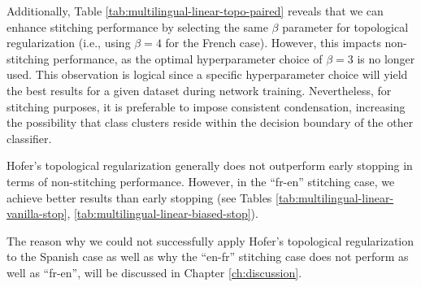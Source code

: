 \documentclass[../main.tex]{subfiles}
\begin{document}
\begin{table}[ht!]
\centering
{}
\caption{Topological reg. w/ matched params (over two random seeds)}
\label{tab:multilingual-linear-topo-paired}
\end{table}

Additionally, Table \ref{tab:multilingual-linear-topo-paired} reveals that we can enhance stitching performance by selecting the same $\beta$ parameter for topological regularization (i.e., using $\beta=4$ for the French case). However, this impacts non-stitching performance, as the optimal hyperparameter choice of $\beta=3$ is no longer used. This observation is logical since a specific hyperparameter choice will yield the best results for a given dataset during network training. Nevertheless, for stitching purposes, it is preferable to impose consistent condensation, increasing the possibility that class clusters reside within the decision boundary of the other classifier.

\begin{mathNote}
Hofer's topological regularization generally does not outperform early stopping in terms of non-stitching performance. However, in the ``fr-en'' stitching case, we achieve better results than early stopping (see Tables \ref{tab:multilingual-linear-vanilla-stop}, \ref{tab:multilingual-linear-biased-stop}).
\end{mathNote}

The reason why we could not successfully apply Hofer's topological regularization to the Spanish case as well as why the ``en-fr'' stitching case does not perform as well as ``fr-en'', will be discussed in Chapter \ref{ch:discussion}.\\
\end{document}
